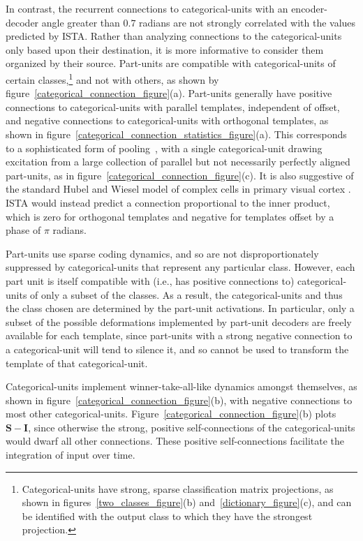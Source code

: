 \documentclass{article} %
\newcommand{\I}{\mathbf{I}}
\newcommand{\Sm}{\mathbf{S}}
\begin{document}
In contrast, the recurrent connections to categorical-units with an encoder-decoder angle greater than $0.7$ radians are not strongly correlated with the values predicted by ISTA.  
Rather than analyzing connections to the categorical-units only based upon their destination, it is more informative to consider them organized by their source.
Part-units are compatible with categorical-units of certain classes,\footnote{Categorical-units have strong, sparse classification matrix projections, as shown in figures~\ref{two_classes_figure}(b) and~\ref{dictionary_figure}(c), and can be identified with the output class to which they have the strongest projection.} and not with others, as shown by figure~\ref{categorical_connection_figure}(a).  
Part-units generally have positive connections to categorical-units with parallel templates, independent of offset, and negative connections to categorical-units with orthogonal templates, as shown in figure~\ref{categorical_connection_statistics_figure}(a).  This corresponds to a sophisticated form of pooling~\citep{jarrett2009},  with a single categorical-unit drawing excitation from a large collection of parallel but not necessarily perfectly aligned part-units, as in figure~\ref{categorical_connection_figure}(c).  It is also suggestive of the standard Hubel and Wiesel model of complex cells in primary visual cortex \citep{hubel1962}.  ISTA would instead predict a connection proportional to the inner product, which is zero for orthogonal templates and negative for templates offset by a phase of $\pi$ radians.  

Part-units use sparse coding dynamics, and so are not disproportionately suppressed by categorical-units that represent any particular class.  However, each part unit is itself compatible with (i.e., has positive connections to) categorical-units of only a subset of the classes.  As a result, the categorical-units and thus the class chosen are determined by the part-unit activations.  In particular, only a subset of the possible deformations implemented by part-unit decoders are freely available for each template, since part-units with a strong negative connection to a categorical-unit will tend to silence it, and so cannot be used to transform the template of that categorical-unit.

Categorical-units implement winner-take-all-like dynamics amongst themselves, as shown in figure~\ref{categorical_connection_figure}(b), with negative connections to most other categorical-units.  Figure~\ref{categorical_connection_figure}(b) plots $\Sm - \I$, since otherwise the strong, positive self-connections of the categorical-units would dwarf all other connections.  These positive self-connections facilitate the integration of input %
over time.
\end{document}
